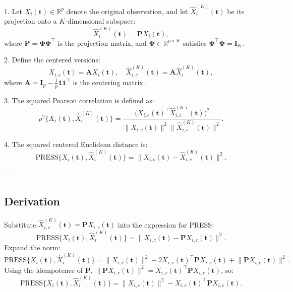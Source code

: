 1. Let \( X_{i}(\mathbf{t}) \in \mathbb{R}^p \) denote the original observation, and let \( \widehat{X}^{(K)}_{i}(\mathbf{t}) \) be its projection onto a \( K \)-dimensional subspace:
\[
\widehat{X}^{(K)}_{i}(\mathbf{t}) = \mathbf{P} X_{i}(\mathbf{t}),
\]
where \( \mathbf{P} = \bm{\Phi} \bm{\Phi}^\top \) is the projection matrix, and \( \bm{\Phi} \in \mathbb{R}^{p \times K} \) satisfies \( \bm{\Phi}^\top \bm{\Phi} = \mathbf{I}_K \).

2. Define the centered versions:
\[
X_{i,c}(\mathbf{t}) = \mathbf{A} X_{i}(\mathbf{t}), \quad 
\widehat{X}^{(K)}_{i,c}(\mathbf{t}) = \mathbf{A} \widehat{X}^{(K)}_{i}(\mathbf{t}),
\]
where \( \mathbf{A} = \mathbf{I}_p - \frac{1}{p} \mathbf{1} \mathbf{1}^\top \) is the centering matrix.

3. The squared Pearson correlation is defined as:
\[
\rho^2 \bigg\{ X_{i}(\mathbf{t}), \widehat{X}^{(K)}_{i} (\mathbf{t}) \bigg\} 
= \frac{\bigg( X_{i,c}(\mathbf{t})^\top \widehat{X}^{(K)}_{i,c}(\mathbf{t}) \bigg)^2}
{\bigg\| X_{i,c}(\mathbf{t}) \bigg\|^2 \bigg\| \widehat{X}^{(K)}_{i,c}(\mathbf{t}) \bigg\|^2}.
\]

4. The squared centered Euclidean distance is:
\[
\text{PRESS}\bigg\{ X_{i}(\mathbf{t}), \widehat{X}^{(K)}_{i} (\mathbf{t}) \bigg\} 
= \bigg\| X_{i,c}(\mathbf{t}) - \widehat{X}^{(K)}_{i,c}(\mathbf{t}) \bigg\|^2.
\]

---

\subsection*{Derivation}

Substitute \( \widehat{X}^{(K)}_{i,c}(\mathbf{t}) = \mathbf{P} X_{i,c}(\mathbf{t}) \) into the expression for PRESS:
\[
\text{PRESS}\bigg\{ X_{i}(\mathbf{t}), \widehat{X}^{(K)}_{i} (\mathbf{t}) \bigg\}
= \bigg\| X_{i,c}(\mathbf{t}) - \mathbf{P} X_{i,c}(\mathbf{t}) \bigg\|^2.
\]
Expand the norm:
\[
\text{PRESS}\bigg\{ X_{i}(\mathbf{t}), \widehat{X}^{(K)}_{i} (\mathbf{t}) \bigg\}
= \bigg\| X_{i,c}(\mathbf{t}) \bigg\|^2 - 2 X_{i,c}(\mathbf{t})^\top \mathbf{P} X_{i,c}(\mathbf{t}) + \bigg\| \mathbf{P} X_{i,c}(\mathbf{t}) \bigg\|^2.
\]
Using the idempotence of \( \mathbf{P} \), \( \big\| \mathbf{P} X_{i,c}(\mathbf{t}) \big\|^2 = X_{i,c}(\mathbf{t})^\top \mathbf{P} X_{i,c}(\mathbf{t}) \), so:
\[
\text{PRESS}\bigg\{ X_{i}(\mathbf{t}), \widehat{X}^{(K)}_{i} (\mathbf{t}) \bigg\}
= \bigg\| X_{i,c}(\mathbf{t}) \bigg\|^2 - X_{i,c}(\mathbf{t})^\top \mathbf{P} X_{i,c}(\mathbf{t}).
\]

